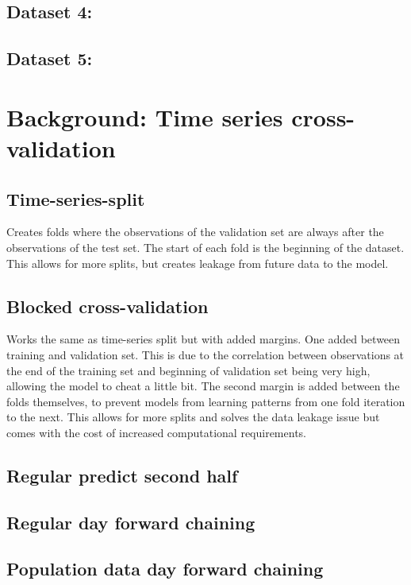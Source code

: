 \documentclass[conference]{IEEEtran}
\begin{document}
\subsection{Dataset 4: }

\subsection{Dataset 5: }

\section{Background: Time series cross-validation}

\subsection{Time-series-split}

Creates folds where the observations of the validation set are always after the observations of the test set. The start of each fold is the beginning of the dataset. This allows for more splits, but creates leakage from future data to the model.

\subsection{Blocked cross-validation}

Works the same as time-series split but with added margins. One added between training and validation set. This is due to the correlation between observations at the end of the training set and beginning of validation set being very high, allowing the model to cheat a little bit. The second margin is added between the folds themselves, to prevent models from learning patterns from one fold iteration to the next. This allows for more splits and solves the data leakage issue but comes with the cost of increased computational requirements.

\subsection{Regular predict second half}

\subsection{Regular day forward chaining}

\subsection{Population data day forward chaining}
\end{document}
